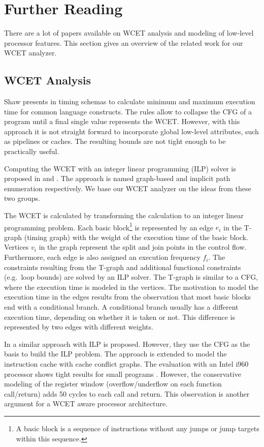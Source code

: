 \section{Further Reading}
\label{sec:wcet:related}

There are a lot of papers available on WCET analysis and modeling of
low-level processor features. This section gives an overview of the
related work for our WCET analyzer.

\subsection{WCET Analysis}

Shaw presents in \cite{Shaw:timeschema} timing schemas to calculate
minimum and maximum execution time for common language constructs.
The rules allow to collapse the CFG of a program until a final single
value represents the WCET. However, with this approach it is not
straight forward to incorporate global low-level attributes, such as
pipelines or caches. The resulting bounds are not tight enough to be
practically useful.

Computing the WCET with an integer linear programming (ILP) solver is
proposed in \cite{Puschner:JRTS1997} and \cite{216666}. The approach
is named graph-based and implicit path enumeration respectively. We
base our WCET analyzer on the ideas from these two groups.

The WCET is calculated by transforming the calculation to an integer
linear programming problem. Each basic block\footnote{A basic block
is a sequence of instructions without any jumps or jump targets
within this sequence.} is represented by an edge $e_i$ in the T-graph
(timing graph) with the weight of the execution time of the basic
block. Vertices $v_i$ in the graph represent the split and join
points in the control flow. Furthermore, each edge is also assigned
an execution frequency $f_i$. The constraints resulting from the
T-graph and additional functional constraints (e.g.\ loop bounds) are
solved by an ILP solver. The T-graph is similar to a CFG, where the
execution time is modeled in the vertices. The motivation to model
the execution time in the edges results from the observation that
most basic blocks end with a conditional branch. A conditional branch
usually has a different execution time, depending on whether it is
taken or not. This difference is represented by two edges with
different weights.

In \cite{216666} a similar approach with ILP is proposed. However,
they use the CFG as the basis to build the ILP problem. The approach
is extended to model the instruction cache with cache conflict
graphs. The evaluation with an Intel i960 processor shows tight
results for small programs \cite{828940}. However, the conservative
modeling of the register window (overflow/underflow on each function
call/return) adds 50 cycles to each call and return. This observation
is another argument for a WCET aware processor architecture.

